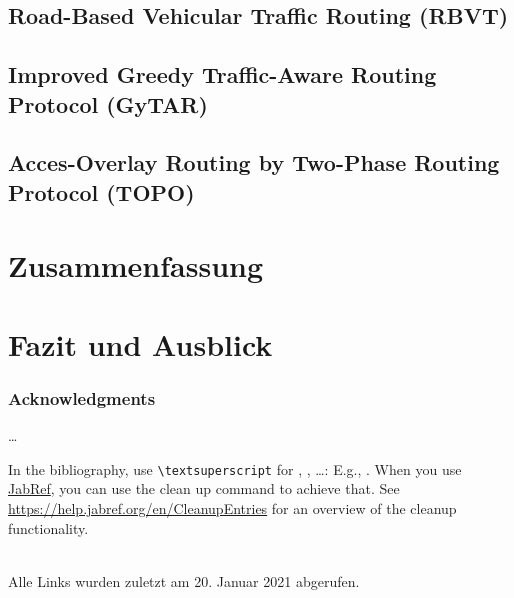 \documentclass[english,runningheads,a4paper]{llncs}[2018/03/10]
\begin{document}
\subsection{Road-Based Vehicular Traffic Routing (RBVT)}
\subsection{Improved Greedy Traffic-Aware Routing Protocol (GyTAR)}
\subsection{Acces-Overlay Routing by Two-Phase Routing Protocol (TOPO)}

\section{Zusammenfassung}
\label{sec:summary}

\section{Fazit und Ausblick}
\label{sec:conclusion}

\subsubsection*{Acknowledgments}
\ldots

In the bibliography, use \texttt{\textbackslash textsuperscript} for , , \ldots:
E.g., .
When you use \href{https://www.jabref.org}{JabRef}, you can use the clean up command to achieve that.
See \url{https://help.jabref.org/en/CleanupEntries} for an overview of the cleanup functionality.

\renewcommand{\bibsection}{\section*{References}} %

\begingroup
  \ifluatex
  \else
  \fi
  \small %
  
\endgroup

\ \\
%
Alle Links wurden zuletzt am 20. Januar 2021 abgerufen.
\end{document}
